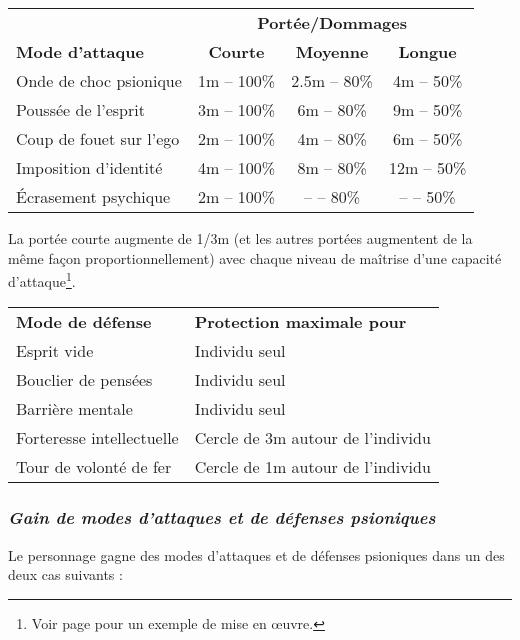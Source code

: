 \bigskip

\begin{tabular}{lccc}
&\multicolumn{3}{c}{\textbf{Portée/Dommages}} \\
\textbf{Mode d'attaque} & \textbf{Courte} & \textbf{Moyenne} & \textbf{Longue} \\
Onde de choc psionique  & 1m -- 100\% & 2.5m -- 80\% &  4m -- 50\% \\
Poussée de l'esprit     & 3m -- 100\% &   6m -- 80\% &  9m -- 50\% \\
Coup de fouet sur l'ego & 2m -- 100\% &   4m -- 80\% &  6m -- 50\% \\
Imposition d'identité   & 4m -- 100\% &   8m -- 80\% & 12m -- 50\% \\
Écrasement psychique    & 2m -- 100\% &   -- -- 80\% & --  -- 50\% \\
\end{tabular}

\bigskip

La portée courte augmente de 1/3m (et les autres portées augmentent de la même façon proportionnellement) avec chaque niveau de maîtrise d'une capacité d'attaque\footnote{Voir page \pageref{exemple-complet} pour un exemple de mise en œuvre.}.

\bigskip

\begin{tabular}{ll}
\textbf{Mode de défense} & \textbf{Protection maximale pour} \\
Esprit vide & Individu seul \\
Bouclier de pensées & Individu seul \\
Barrière mentale & Individu seul \\
Forteresse intellectuelle & Cercle de 3m autour de l'individu \\
Tour de volonté de fer & Cercle de 1m autour de l'individu \\
\end{tabular}

\bigskip

\subsubsection*{\textit{Gain de modes d'attaques et de défenses psioniques}}

Le personnage gagne des modes d'attaques et de défenses psioniques dans un des deux cas suivants :

